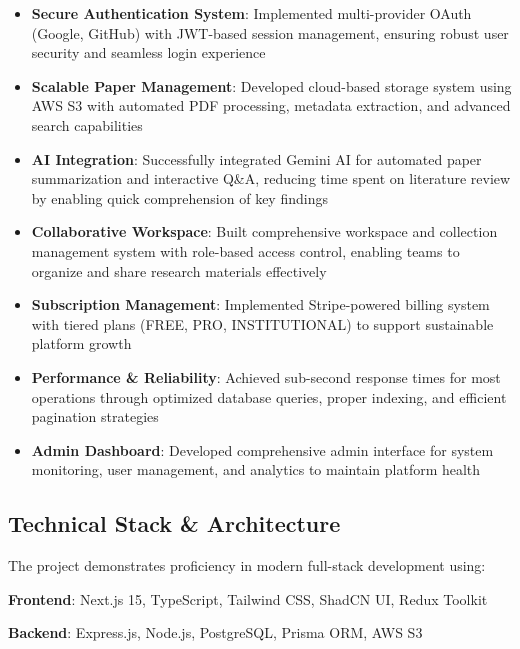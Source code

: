 \begin{itemize}[leftmargin=*,topsep=3pt,itemsep=2pt]
    \item \textbf{Secure Authentication System}: Implemented multi-provider OAuth (Google, GitHub) with JWT-based session management, ensuring robust user security and seamless login experience
    
    \item \textbf{Scalable Paper Management}: Developed cloud-based storage system using AWS S3 with automated PDF processing, metadata extraction, and advanced search capabilities
    
    \item \textbf{AI Integration}: Successfully integrated Gemini AI for automated paper summarization and interactive Q\&A, reducing time spent on literature review by enabling quick comprehension of key findings
    
    \item \textbf{Collaborative Workspace}: Built comprehensive workspace and collection management system with role-based access control, enabling teams to organize and share research materials effectively
    
    \item \textbf{Subscription Management}: Implemented Stripe-powered billing system with tiered plans (FREE, PRO, INSTITUTIONAL) to support sustainable platform growth
    
    \item \textbf{Performance \& Reliability}: Achieved sub-second response times for most operations through optimized database queries, proper indexing, and efficient pagination strategies
    
    \item \textbf{Admin Dashboard}: Developed comprehensive admin interface for system monitoring, user management, and analytics to maintain platform health
\end{itemize}

\subsection{Technical Stack \& Architecture}

The project demonstrates proficiency in modern full-stack development using:

\textbf{Frontend}: Next.js 15, TypeScript, Tailwind CSS, ShadCN UI, Redux Toolkit

\textbf{Backend}: Express.js, Node.js, PostgreSQL, Prisma ORM, AWS S3

